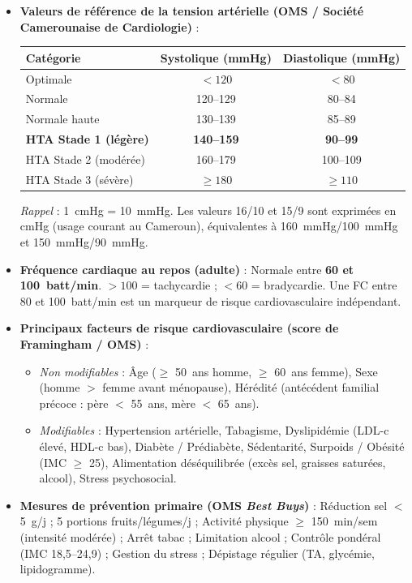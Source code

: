 \documentclass[11pt]{article}
\begin{document}
\begin{itemize}
    \item \textbf{Valeurs de référence de la tension artérielle (OMS / Société Camerounaise de Cardiologie)} :
    \begin{center}
    \begin{tabular}{|l|c|c|}\hline
    \textbf{Catégorie} & \textbf{Systolique (mmHg)} & \textbf{Diastolique (mmHg)} \\ \hline
    Optimale & $< 120$ & $< 80$ \\ \hline
    Normale & 120--129 & 80--84 \\ \hline
    Normale haute & 130--139 & 85--89 \\ \hline
    \textbf{HTA Stade 1 (légère)} & \textbf{140--159} & \textbf{90--99} \\ \hline
    HTA Stade 2 (modérée) & 160--179 & 100--109 \\ \hline
    HTA Stade 3 (sévère) & $\ge 180$ & $\ge 110$ \\ \hline
    \end{tabular}
    \end{center}
    \textit{Rappel} : 1~cmHg = 10~mmHg. Les valeurs 16/10 et 15/9 sont exprimées en cmHg (usage courant au Cameroun), équivalentes à \SI{160}{\mmHg}/\SI{100}{\mmHg} et \SI{150}{\mmHg}/\SI{90}{\mmHg}.
    
    \item \textbf{Fréquence cardiaque au repos (adulte)} : Normale entre \textbf{60 et 100~batt/min}. $> 100$ = tachycardie ; $< 60$ = bradycardie. Une FC entre 80 et 100~batt/min est un marqueur de risque cardiovasculaire indépendant.
    
    \item \textbf{Principaux facteurs de risque cardiovasculaire (score de Framingham / OMS)} :
    \begin{itemize}
        \item \textit{Non modifiables} : Âge ($\ge$ 50~ans homme, $\ge$ 60~ans femme), Sexe (homme $>$ femme avant ménopause), Hérédité (antécédent familial précoce : père $<$ 55~ans, mère $<$ 65~ans).
        \item \textit{Modifiables} : Hypertension artérielle, Tabagisme, Dyslipidémie (LDL-c élevé, HDL-c bas), Diabète / Prédiabète, Sédentarité, Surpoids / Obésité (IMC $\ge$ 25), Alimentation déséquilibrée (excès sel, graisses saturées, alcool), Stress psychosocial.
    \end{itemize}
    
    \item \textbf{Mesures de prévention primaire (OMS \emph{Best Buys})} : Réduction sel $<$ \SI{5}{g/j} ; 5 portions fruits/légumes/j ; Activité physique $\ge$ \SI{150}{min/sem} (intensité modérée) ; Arrêt tabac ; Limitation alcool ; Contrôle pondéral (IMC 18,5--24,9) ; Gestion du stress ; Dépistage régulier (TA, glycémie, lipidogramme).
\end{itemize}
\end{document}
